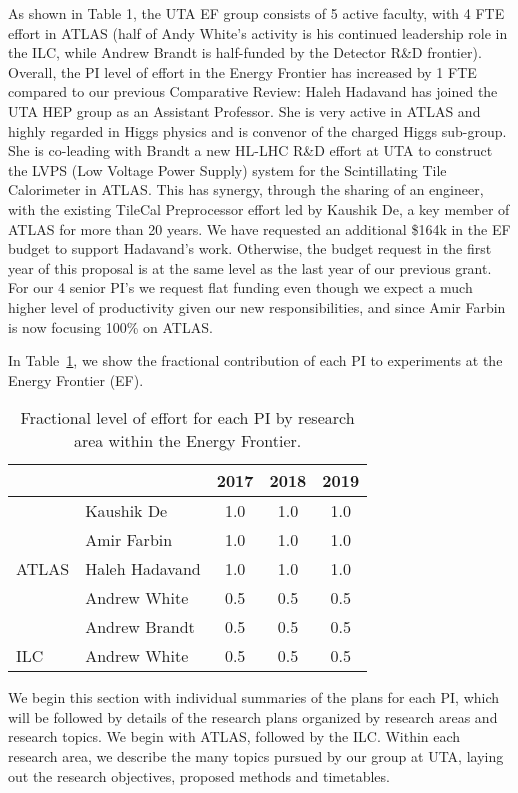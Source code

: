 
As shown in Table 1, the UTA EF group consists of 5 active faculty, with 4 FTE effort in ATLAS (half of Andy White's activity is his continued leadership role in the ILC, while Andrew Brandt is half-funded by the Detector R\&D frontier). Overall, the PI level of effort in the Energy Frontier has increased by 1 FTE compared to our previous Comparative Review: Haleh Hadavand has joined the UTA HEP group as an Assistant Professor. She is very active in ATLAS and highly regarded in Higgs physics and is convenor of the charged Higgs sub-group. She is co-leading with  Brandt a new HL-LHC R\&D effort at UTA to construct the LVPS (Low Voltage Power Supply) system for the Scintillating Tile Calorimeter in ATLAS. This has synergy, through the sharing of an engineer, with the existing TileCal Preprocessor effort led by Kaushik De, a key member of ATLAS for more than 20 years. We have requested an additional \$164k in the EF budget to support Hadavand's  work. Otherwise, the budget request in the first year of this proposal is at the  same level as the last year of our previous grant. For our 4 senior PI's we request flat funding even though we expect a much higher level of productivity given our new responsibilities, and since Amir Farbin is now focusing 100\% on ATLAS.   

In Table~\ref{table:ef-fractions}, we show the fractional contribution of each PI to experiments at the Energy Frontier (EF).

\begin{table}[htb]
\centering
\begin{tabular}{ l | l | c | c | c }
\hline \hline
\multicolumn{2}{c|}{} & 2017 & 2018 & 2019 \\ \hline
\multirow{5}{*}{ATLAS} & Kaushik De & 1.0 & 1.0 & 1.0 \\ \cline{2-5}
 & Amir Farbin & 1.0 & 1.0 &1.0 \\ \cline{2-5}
 & Haleh Hadavand & 1.0 & 1.0 & 1.0 \\ \cline{2-5}
 & Andrew White & 0.5 & 0.5 & 0.5 \\ \cline{2-5}
 & Andrew Brandt & 0.5 & 0.5 & 0.5 \\ \hline
ILC & Andrew White & 0.5 & 0.5 & 0.5 \\ \hline  \hline
\end{tabular}
\caption{Fractional level of effort for each PI by research area within the Energy Frontier.}
\label{table:ef-fractions}
\end{table}

We begin this section with individual summaries of the plans for each PI, which will be followed by details of the research plans organized by research areas and research topics. We begin with ATLAS, followed by the ILC. Within each research area, we describe the many topics pursued by our group at UTA, laying out the research objectives, proposed methods and timetables.

